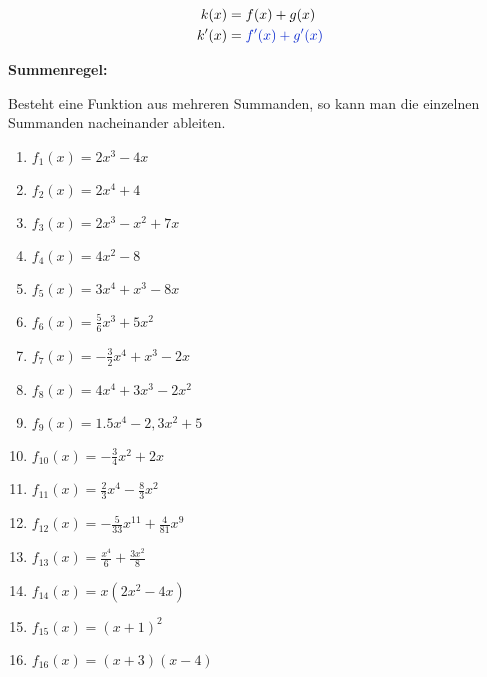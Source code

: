 \begin{minipage}{\textwidth}
	\begin{minipage}{0.3\textwidth}
		\begin{align*}
			k(x)&=f(x)+g(x)\\
			k'(x)&=\textcolor{loes}{f'(x)+g'(x)}
		\end{align*}
	\end{minipage}%
	\begin{minipage}{0.7\textwidth}
		\begin{tcolorbox}
			\textbf{Summenregel:}

				\textcolor{loestc}{Besteht eine Funktion aus mehreren Summanden, so kann man die einzelnen Summanden nacheinander ableiten.}
		\end{tcolorbox}
	\end{minipage}%
\end{minipage}
	\begin{Exercise}[title={\raggedright Berechne jeweils allgemein die Ableitung \(f'(x)\)}, label=summenregelA1]

		\begin{minipage}{\textwidth}
			\begin{minipage}{0.5\textwidth}
				\begin{enumerate}[label=\alph*)]
					\item \(f_1(x)=2x^3-4x\)
					\item \(f_2(x)=2x^4+4\)
					\item \(f_3(x)=2x^3-x^2+7x\)
					\item \(f_4(x)=4x^2-8\)
					\item \(f_5(x)=3x^4+x^3-8x\)
					\item \(f_6(x)=\frac{5}{6}x^3+5x^2\)
					\item \(f_7(x)=-\frac{3}{2}x^4+x^3-2x\)
					\item \(f_8(x)=4x^4+3x^3-2x^2\)
				\end{enumerate}
			\end{minipage}%
			\begin{minipage}{0.5\textwidth}
				\begin{enumerate}[label=\alph*)]
					\setcounter{enumi}{8}
					\item \(f_9(x)=1.5x^4-2,3x^2+5\)
					\item \(f_{10}(x)=-\frac{3}{4}x^2+2x\)
					\item \(f_{11}(x)=\frac{2}{3}x^4-\frac{8}{3}x^2\)
					\item \(f_{12}(x)=-\frac{5}{33}x^{11}+\frac{4}{81}x^9\)
					\item \(f_{13}(x)=\frac{x^4}{6}+\frac{3x^2}{8}\)
					\item \(f_{14}(x)=x(2x^2-4x)\)
					\item \(f_{15}(x)=(x+1)^2\)
					\item \(f_{16}(x)=(x+3)(x-4)\)
				\end{enumerate}
			\end{minipage}%
		\end{minipage}
	\end{Exercise}
